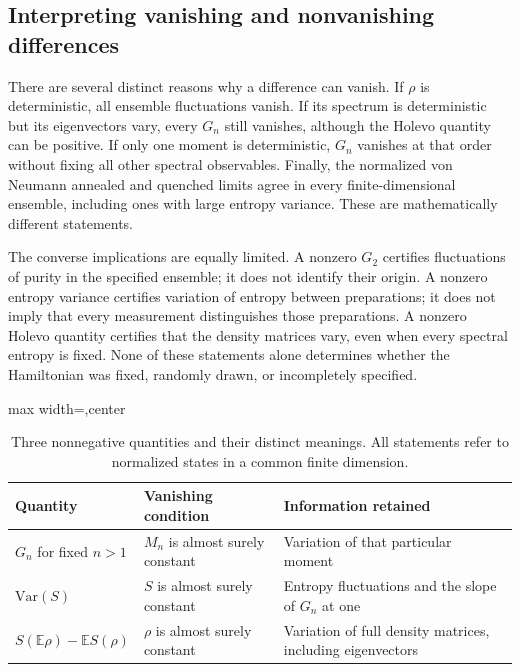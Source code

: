 \documentclass[11pt,letterpaper]{article}
\theoremstyle{plain}
\theoremstyle{definition}
\theoremstyle{remark}
\newcommand{\E}{\mathbb{E}}
\newcommand{\Var}{\text{Var}}
\begin{document}
\subsection{Interpreting vanishing and nonvanishing differences}
\label{subsec12:three_scenarios}

There are several distinct reasons why a difference can vanish. If
$\rho$ is deterministic, all ensemble fluctuations vanish. If its
spectrum is deterministic but its eigenvectors vary, every $G_n$ still
vanishes, although the Holevo quantity can be positive. If only one
moment is deterministic, $G_n$ vanishes at that order without fixing
all other spectral observables. Finally, the normalized von Neumann
annealed and quenched limits agree in every finite-dimensional
ensemble, including ones with large entropy variance. These are
mathematically different statements.

The converse implications are equally limited. A nonzero $G_2$
certifies fluctuations of purity in the specified ensemble; it does
not identify their origin. A nonzero entropy variance certifies variation
of entropy between preparations; it does not imply that every
measurement distinguishes those preparations. A nonzero Holevo quantity
certifies that the density matrices vary, even when every spectral
entropy is fixed. None of these statements alone determines whether
the Hamiltonian was fixed, randomly drawn, or incompletely specified.

\begin{table}[tbp]
\centering
\caption{Three nonnegative quantities and their distinct meanings.
All statements refer to normalized states in a common finite dimension.}
\label{tab12:three_scenarios}
\begin{adjustbox}{max width=\textwidth,center}
\begin{tabular}{p{}p{}p{}}
\toprule
Quantity & Vanishing condition & Information retained \\
\midrule
$G_n$ for fixed $n>1$ & $M_n$ is almost surely constant & Variation of
that particular moment \\[4pt]
$\Var(S)$ & $S$ is almost surely constant & Entropy fluctuations and
the slope of $G_n$ at one \\[4pt]
$S(\E\rho)-\E S(\rho)$ & $\rho$ is almost surely constant & Variation
of full density matrices, including eigenvectors \\
\bottomrule
\end{tabular}
\end{adjustbox}
\end{table}
\end{document}
